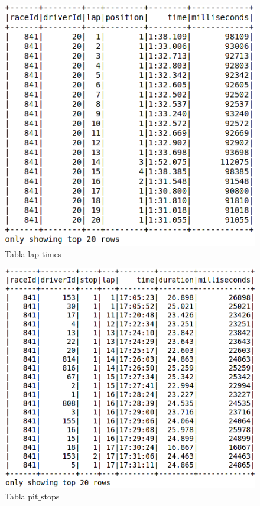 \documentclass[12pt,twoside,titlepage]{report}
\begin{document}
\begin{figure}
  \includegraphics[scale=0.4]{lap_times_table.png}
  \centering
  \caption{Tabla lap$\_$times}
  \label{fig:laptimestab}
  \centering
\end{figure}

\begin{figure}
  \includegraphics[scale=0.4]{pit_stop_table.png}
  \centering
  \caption{Tabla pit$\_$stops}
  \label{fig:pitstops}
  \centering
\end{figure}
\end{document}
